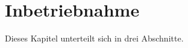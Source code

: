 \documentclass[../../Bachelorarbeit.tex]{subfiles}
\begin{document}
\section{Inbetriebnahme}
Dieses Kapitel unterteilt sich in drei Abschnitte.
\end{document}
